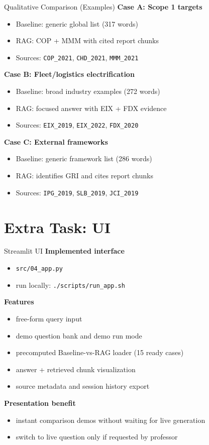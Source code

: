 \documentclass{beamer}
\begin{document}
\begin{frame}{Qualitative Comparison (Examples)}
\small
\textbf{Case A: Scope 1 targets}
\begin{itemize}
  \item Baseline: generic global list (317 words)
  \item RAG: COP + MMM with cited report chunks
  \item Sources: \texttt{COP\_2021}, \texttt{CHD\_2021}, \texttt{MMM\_2021}
\end{itemize}

\textbf{Case B: Fleet/logistics electrification}
\begin{itemize}
  \item Baseline: broad industry examples (272 words)
  \item RAG: focused answer with EIX + FDX evidence
  \item Sources: \texttt{EIX\_2019}, \texttt{EIX\_2022}, \texttt{FDX\_2020}
\end{itemize}

\textbf{Case C: External frameworks}
\begin{itemize}
  \item Baseline: generic framework list (286 words)
  \item RAG: identifies GRI and cites report chunks
  \item Sources: \texttt{IPG\_2019}, \texttt{SLB\_2019}, \texttt{JCI\_2019}
\end{itemize}
\end{frame}

\section{Extra Task: UI}

\begin{frame}{Streamlit UI}
\small
\textbf{Implemented interface}
\begin{itemize}
  \item \texttt{src/04\_app.py}
  \item run locally: \texttt{./scripts/run\_app.sh}
\end{itemize}

\textbf{Features}
\begin{itemize}
  \item free-form query input
  \item demo question bank and demo run mode
  \item precomputed Baseline-vs-RAG loader (15 ready cases)
  \item answer + retrieved chunk visualization
  \item source metadata and session history export
\end{itemize}
\textbf{Presentation benefit}
\begin{itemize}
  \item instant comparison demos without waiting for live generation
  \item switch to live question only if requested by professor
\end{itemize}
\end{frame}
\end{document}
